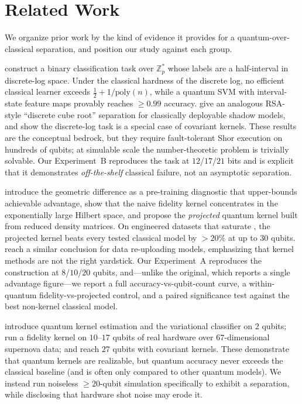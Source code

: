 \section{Related Work}
\label{sec:related}

We organize prior work by the kind of evidence it provides for a
quantum-over-classical separation, and position our study against each group.

\citet{liu2021rigorous} construct a binary classification task over $\mathbb{Z}_p^*$
whose labels are a half-interval in discrete-log space. Under the classical
hardness of the discrete log, no efficient classical learner exceeds
$\tfrac{1}{2}+1/\mathrm{poly}(n)$, while a quantum SVM with interval-state
feature maps provably reaches $\ge 0.99$ accuracy. \citet{jerbi2023shadows}
give an analogous RSA-style ``discrete cube root'' separation for classically
deployable shadow models, and \citet{glick2021covariant} show the discrete-log
task is a special case of covariant kernels. These results are the conceptual
bedrock, but they require fault-tolerant Shor execution on hundreds of qubits;
at simulable scale the number-theoretic problem is trivially solvable. Our
Experiment~B reproduces the \citeauthor{liu2021rigorous} task at $12$/$17$/$21$
bits and is explicit that it demonstrates \emph{off-the-shelf} classical failure,
not an asymptotic separation.

\citet{huang2021power} introduce the geometric difference \gdiff{} as a
pre-training diagnostic that upper-bounds achievable advantage, show that the
naive fidelity kernel concentrates in the exponentially large Hilbert space, and
propose the \emph{projected} quantum kernel built from reduced density matrices.
On engineered datasets that saturate \gdiff{}, the projected kernel beats every
tested classical model by $>20\%$ at up to $30$ qubits. \citet{jerbi2023beyond}
reach a similar conclusion for data re-uploading models, emphasizing that kernel
methods are not the right yardstick. Our Experiment~A reproduces the
\citeauthor{huang2021power} construction at $8$/$10$/$20$ qubits, and---unlike the
original, which reports a single advantage figure---we report a full
accuracy-vs-qubit-count curve, a within-quantum fidelity-vs-projected control, and
a paired significance test against the best non-kernel classical model.

\citet{havlicek2019supervised} introduce quantum kernel estimation and the
variational classifier on $2$ qubits; \citet{peters2021machine} run a fidelity
kernel on $10$--$17$ qubits of real hardware over $67$-dimensional supernova data;
and \citet{glick2021covariant} reach $27$ qubits with covariant kernels. These
demonstrate that quantum kernels are realizable, but quantum accuracy never
exceeds the classical baseline (and is often only compared to other quantum
models). We instead run noiseless $\ge 20$-qubit simulation specifically to
exhibit a separation, while disclosing that hardware shot noise may erode it.

